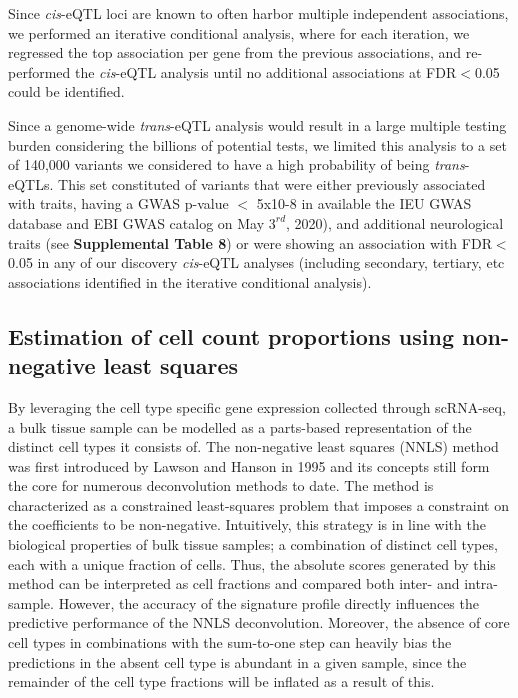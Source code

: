 Since \emph{cis}-eQTL loci are known to often harbor multiple independent associations, we performed an iterative conditional analysis, where for each iteration, we regressed the top association per gene from the previous associations, and re-performed the \emph{cis}-eQTL analysis until no additional associations at FDR$<$0.05 could be identified. 

Since a genome-wide \emph{trans}-eQTL analysis would result in a large multiple testing burden considering the billions of potential tests, we limited this analysis to a set of 140,000 variants we considered to have a high probability of being \emph{trans}-eQTLs. This set constituted of variants that were either previously associated with traits, having a GWAS p-value $<$ 5x10-8 in available the IEU GWAS database\cite{lyonVariantCallFormat2020} and EBI GWAS catalog\cite{bunielloNHGRIEBIGWASCatalog2019} on May $3^{rd}$, 2020), and additional neurological traits (see \textbf{Supplemental Table 8}) or were showing an association with FDR$<$0.05 in any of our discovery \emph{cis}-eQTL analyses (including secondary, tertiary, etc associations identified in the iterative conditional analysis). 

\subsection{Estimation of cell count proportions using non-negative least squares}
By leveraging the cell type specific gene expression collected through scRNA-seq, a bulk tissue sample can be modelled as a parts-based representation of the distinct cell types it consists of. The non-negative least squares (NNLS) method was first introduced by Lawson and Hanson in 1995\cite{lawsonSolvingLeastSquares1995} and its concepts still form the core for numerous deconvolution methods to date. The method is characterized as a constrained least-squares problem that imposes a constraint on the coefficients to be non-negative. Intuitively, this strategy is in line with the biological properties of bulk tissue samples; a combination of distinct cell types, each with a unique fraction of cells. Thus, the absolute scores generated by this method can be interpreted as cell fractions and compared both inter- and intra-sample\cite{sturmComprehensiveEvaluationComputational2018}. However, the accuracy of the signature profile directly influences the predictive performance of the NNLS deconvolution. Moreover, the absence of core cell types in combinations with the sum-to-one step can heavily bias the predictions in the absent cell type is abundant in a given sample, since the remainder of the cell type fractions will be inflated as a result of this. 

